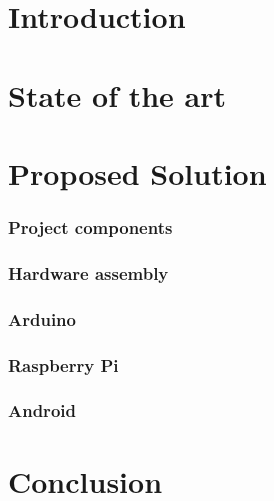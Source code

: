 \documentclass[11pt, a4paper,openany]{article}%
\begin{document}


\setlength{\parindent}{0cm}


\newpage
{} 
\tableofcontents
\clearpage
\listoffigures 
\clearpage

\part{Introduction} 

\newpage


\part{State of the art} 

\newpage



\part{Proposed Solution} 
\section{Project components}

\newpage
\section{Hardware assembly}

\newpage
\section{Arduino}

\newpage
\section{Raspberry Pi}

\newpage
\section{Android} 

\newpage


\part{Conclusion} 

\newpage


\end{document}
